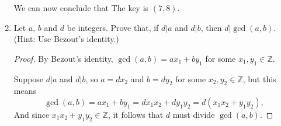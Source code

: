 \documentclass[11pt]{article}
\newcommand{\Z}{\mathbb{Z}}
\begin{document}
\begin{enumerate}
      We can now conclude that The key is \((7,8)\).


    \item Let \(a\), \(b\) and \(d\) be integers. Prove that, if \(d|a\) and \(d|b\), then \(d| \gcd(a,b)\). (Hint: Use Bezout’s identity.)
      \begin{proof}
        By Bezout's identity, \(\gcd(a,b) = ax_1 + by_1\) for some \(x_1,y_1 \in \Z\).

        Suppose \(d|a\) and \(d|b\), so \(a = dx_2\) and \(b = dy_2\) for some \(x_2,y_2 \in \Z\), but this means
        \[\gcd(a,b) = ax_1 + by_1 = dx_1x_2 + dy_1y_2 = d(x_1x_2 + y_1y_2),\]
        And since \(x_1x_2 + y_1y_2 \in \Z\), it follows that \(d\) must divide \(\gcd(a,b)\).
      \end{proof}
      
  \end{enumerate}
\end{document}
